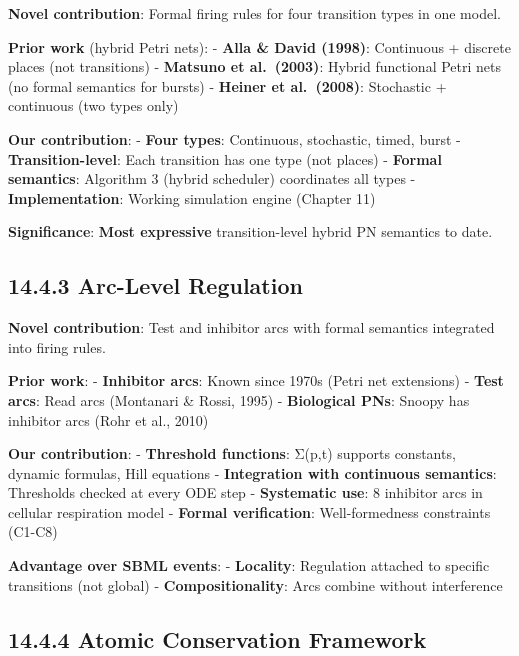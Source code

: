 \textbf{Novel contribution}: Formal firing rules for four transition
types in one model.

\textbf{Prior work} (hybrid Petri nets): - \textbf{Alla \& David
(1998)}: Continuous + discrete places (not transitions) -
\textbf{Matsuno et al.~(2003)}: Hybrid functional Petri nets (no formal
semantics for bursts) - \textbf{Heiner et al.~(2008)}: Stochastic +
continuous (two types only)

\textbf{Our contribution}: - \textbf{Four types}: Continuous,
stochastic, timed, burst - \textbf{Transition-level}: Each transition
has one type (not places) - \textbf{Formal semantics}: Algorithm 3
(hybrid scheduler) coordinates all types - \textbf{Implementation}:
Working simulation engine (Chapter 11)

\textbf{Significance}: \textbf{Most expressive} transition-level hybrid
PN semantics to date.

\hypertarget{arc-level-regulation}{%
\subsection{14.4.3 Arc-Level Regulation}\label{arc-level-regulation}}

\textbf{Novel contribution}: Test and inhibitor arcs with formal
semantics integrated into firing rules.

\textbf{Prior work}: - \textbf{Inhibitor arcs}: Known since 1970s (Petri
net extensions) - \textbf{Test arcs}: Read arcs (Montanari \& Rossi,
1995) - \textbf{Biological PNs}: Snoopy has inhibitor arcs (Rohr et al.,
2010)

\textbf{Our contribution}: - \textbf{Threshold functions}: Σ(p,t)
supports constants, dynamic formulas, Hill equations -
\textbf{Integration with continuous semantics}: Thresholds checked at
every ODE step - \textbf{Systematic use}: 8 inhibitor arcs in cellular
respiration model - \textbf{Formal verification}: Well-formedness
constraints (C1-C8)

\textbf{Advantage over SBML events}: - \textbf{Locality}: Regulation
attached to specific transitions (not global) -
\textbf{Compositionality}: Arcs combine without interference

\hypertarget{atomic-conservation-framework}{%
\subsection{14.4.4 Atomic Conservation
Framework}\label{atomic-conservation-framework}}

